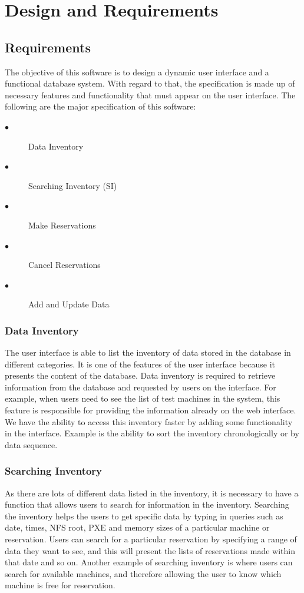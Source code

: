 \chapter{Design and Requirements}
\label{chap:figtab}
\label{chap}
\section{Requirements}\label{requirements}
The objective of this software is to  design a dynamic user interface and a functional database system. With regard to that, the specification is made up of necessary features and functionality that must appear on the user interface. The following are the major specification of this software:
\begin{description}
\item[$\bullet$] Data Inventory
\item[$\bullet$] Searching Inventory (SI)
\item[$\bullet$] Make Reservations
\item[$\bullet$] Cancel Reservations
\item[$\bullet$] Add and Update Data
\end{description}
\subsection{Data Inventory}
The user interface is able to list the inventory of data stored in the database in different categories. It is one of the features of the user interface because it presents the content of the database. Data inventory is required to retrieve information from the database and requested by users on the interface. For example, when users need to see the list of test machines in the system, this feature is responsible for providing the information already on the web interface. We have the ability to access this inventory faster by adding some functionality in the interface. Example is the ability to sort the inventory chronologically or by data sequence. 
\subsection{Searching Inventory} \label{searchinventory}
As there are lots of different data listed in the inventory, it is necessary to have a function that allows users to search for information in the inventory. Searching the inventory helps the users to get specific data by typing in queries such as date, times, NFS root, PXE and memory sizes of a particular machine or reservation. Users can search for a particular reservation by specifying a range of data they want to see, and this will present the lists of reservations made within that date and so on. Another example of searching inventory is where users can search for available machines, and therefore allowing the user to know which machine is free for reservation.

